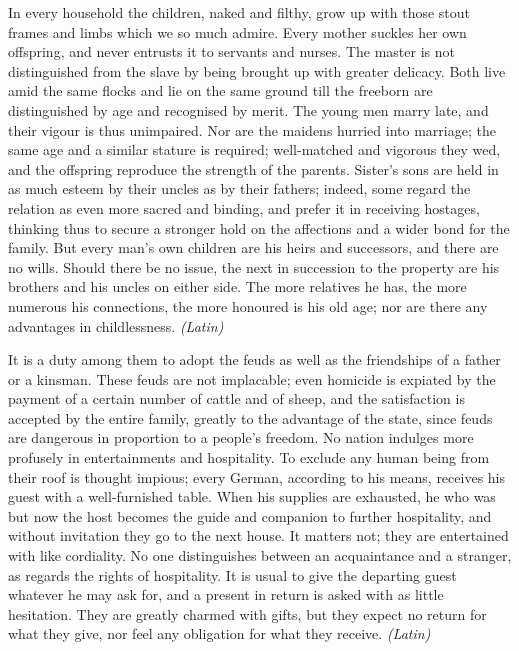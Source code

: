 
In every household the children, naked and filthy, grow up with those stout frames and limbs which we so much admire. Every mother suckles her own offspring, and never entrusts it to servants and nurses. The master is not distinguished from the slave by being brought up with greater delicacy. Both live amid the same flocks and lie on the same ground till the freeborn are distinguished by age and recognised by merit. The young men marry late, and their vigour is thus unimpaired. Nor are the maidens hurried into marriage; the same age and a similar stature is required; well-matched and vigorous they wed, and the offspring reproduce the strength of the parents. Sister's sons are held in as much esteem by their uncles as by their fathers; indeed, some regard the relation as even more sacred and binding, and prefer it in receiving hostages, thinking thus to secure a stronger hold on the affections and a wider bond for the family. But every man's own children are his heirs and successors, and there are no wills. Should there be no issue, the next in succession to the property are his brothers and his uncles on either side. The more relatives he has, the more numerous his connections, the more honoured is his old age; nor are there any advantages in childlessness. \emph{(Latin)}


It is a duty among them to adopt the feuds as well as the friendships of a father or a kinsman. These feuds are not implacable; even homicide is expiated by the payment of a certain number of cattle and of sheep, and the satisfaction is accepted by the entire family, greatly to the advantage of the state, since feuds are dangerous in proportion to a people's freedom. No nation indulges more profusely in entertainments and hospitality. To exclude any human being from their roof is thought impious; every German, according to his means, receives his guest with a well-furnished table. When his supplies are exhausted, he who was but now the host becomes the guide and companion to further hospitality, and without invitation they go to the next house. It matters not; they are entertained with like cordiality. No one distinguishes between an acquaintance and a stranger, as regards the rights of hospitality. It is usual to give the departing guest whatever he may ask for, and a present in return is asked with as little hesitation. They are greatly charmed with gifts, but they expect no return for what they give, nor feel any obligation for what they receive. \emph{(Latin)}

